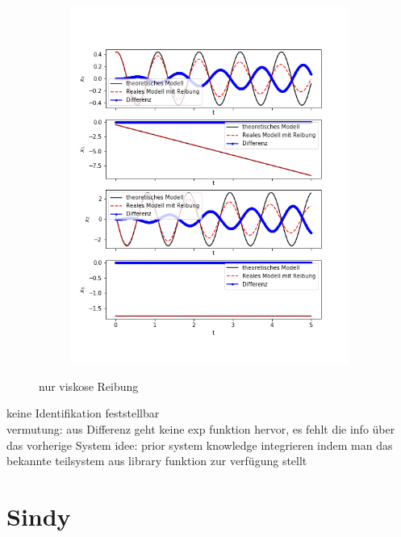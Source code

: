 \documentclass[arbeit=studie,oneside,BCOR=12mm]{ArbeitRST}
\begin{document}
\begin{figure}
\begin{subfigure}[c]{0.5\textwidth}
\includegraphics[width=1\textwidth]{images/pysindy_fric_visk1}
\end{subfigure}
\caption{nur viskose Reibung}
\end{figure}
keine Identifikation feststellbar\\
vermutung: aus Differenz geht keine exp funktion hervor, es fehlt die info über das vorherige System
idee: prior system knowledge integrieren indem man das bekannte teilsystem aus library funktion zur verfügung stellt
\section{Sindy}
\end{document}
